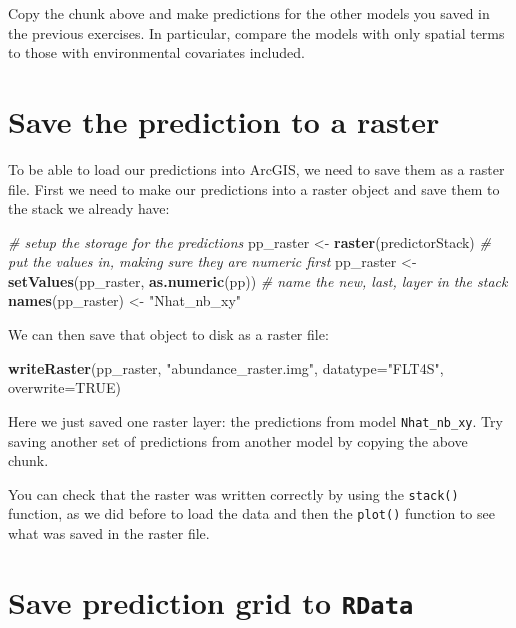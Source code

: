 \documentclass[]{book}
\newenvironment{Shaded}{\begin{snugshade}}{\end{snugshade}}
\newcommand{\KeywordTok}[1]{\textcolor[rgb]{0.13,0.29,0.53}{\textbf{#1}}}
\newcommand{\DataTypeTok}[1]{\textcolor[rgb]{0.13,0.29,0.53}{#1}}
\newcommand{\StringTok}[1]{\textcolor[rgb]{0.31,0.60,0.02}{#1}}
\newcommand{\CommentTok}[1]{\textcolor[rgb]{0.56,0.35,0.01}{\textit{#1}}}
\newcommand{\OtherTok}[1]{\textcolor[rgb]{0.56,0.35,0.01}{#1}}
\newcommand{\NormalTok}[1]{#1}
\theoremstyle{definition}
\theoremstyle{definition}
\theoremstyle{remark}
\begin{document}
Copy the chunk above and make predictions for the other models you saved
in the previous exercises. In particular, compare the models with only
spatial terms to those with environmental covariates included.

\section{Save the prediction to a
raster}\label{save-the-prediction-to-a-raster}

To be able to load our predictions into ArcGIS, we need to save them as
a raster file. First we need to make our predictions into a raster
object and save them to the stack we already have:

\begin{Shaded}
\begin{Highlighting}[]
\CommentTok{# setup the storage for the predictions}
\NormalTok{pp_raster <-}\StringTok{ }\KeywordTok{raster}\NormalTok{(predictorStack)}
\CommentTok{# put the values in, making sure they are numeric first}
\NormalTok{pp_raster <-}\StringTok{ }\KeywordTok{setValues}\NormalTok{(pp_raster, }\KeywordTok{as.numeric}\NormalTok{(pp))}
\CommentTok{# name the new, last, layer in the stack}
\KeywordTok{names}\NormalTok{(pp_raster) <-}\StringTok{ "Nhat_nb_xy"}
\end{Highlighting}
\end{Shaded}

We can then save that object to disk as a raster file:

\begin{Shaded}
\begin{Highlighting}[]
\KeywordTok{writeRaster}\NormalTok{(pp_raster, }\StringTok{"abundance_raster.img"}\NormalTok{, }\DataTypeTok{datatype=}\StringTok{"FLT4S"}\NormalTok{, }\DataTypeTok{overwrite=}\OtherTok{TRUE}\NormalTok{)}
\end{Highlighting}
\end{Shaded}

Here we just saved one raster layer: the predictions from model
\texttt{Nhat\_nb\_xy}. Try saving another set of predictions from
another model by copying the above chunk.

You can check that the raster was written correctly by using the
\texttt{stack()} function, as we did before to load the data and then
the \texttt{plot()} function to see what was saved in the raster file.

\section{\texorpdfstring{Save prediction grid to
\texttt{RData}}{Save prediction grid to RData}}\label{save-prediction-grid-to-rdata}
\end{document}
